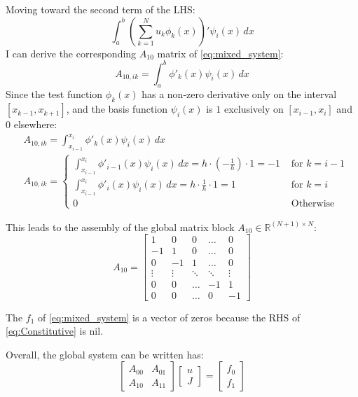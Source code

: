 \documentclass{article}
\begin{document}
Moving toward the second term of the LHS:
\begin{equation*}
    \int_a^b \left(\sum_{k=1}^{N} u_k \phi_k(x)\right)' \psi_i(x) \, dx
\end{equation*}
I can derive the corresponding $A_{10}$ matrix of \eqref{eq:mixed_system}:
\begin{equation*}
    A_{10,ik} = \int_a^b \phi'_k(x) \psi_i(x) \, dx
\end{equation*}
Since the test function $\phi_k(x)$ has a non-zero derivative only on the interval $[x_{k-1}, x_{k+1}]$, and the basis function $\psi_i(x)$ is $1$ exclusively on $[x_{i-1}, x_i]$ and $0$ elsewhere:
\begin{align*}
    &A_{10,ik} = \int_{x_{i-1}}^ {x_{i}} \phi'_k(x) \psi_i(x) \, dx  \\
    &A_{10,ik} = 
    \begin{cases}
           \int_{x_{i-1}}^ {x_{i}} \phi'_{i-1}(x) \psi_i(x) \, dx = h \cdot \left( - \frac{1}{h}\right)  \cdot 1 = - 1 &\text{  for } k = i-1 \\
           \int_{x_{i-1}}^ {x_{i}} \phi'_{i}(x) \psi_i(x) \, dx = h \cdot \frac{1}{h}  \cdot 1 =1 &\text{  for } k = i \\
           0 &\text{  Otherwise } 
    \end{cases}
\end{align*}

This leads to the assembly of the global matrix block $A_{10} \in \mathbb{R}^{(N+1) \times N}$:
\begin{equation} \label{eq:matrix_A10}
    A_{10} = 
    \begin{bmatrix}
         1 &  0 &  0 & \dots &  0 \\
        -1 &  1 &  0 & \dots &  0 \\
         0 & -1 &  1 & \dots &  0 \\
    \vdots & \vdots & \ddots & \ddots & \vdots \\
         0 &  0 & \dots & -1 &  1 \\
         0 &  0 & \dots &  0 & -1
    \end{bmatrix}
\end{equation}

The $f_1$ of \eqref{eq:mixed_system} is a vector of zeros because the RHS of \eqref{eq:Constitutive} is nil.
\newline

Overall, the global system can be written has:
\begin{equation*}
    \begin{bmatrix}
        A_{00} & A_{01} \\
        A_{10} & A_{11}
    \end{bmatrix}
    \begin{bmatrix}
        u \\
        J
    \end{bmatrix}
    =
    \begin{bmatrix}
        f_0 \\
        f_1
    \end{bmatrix}
\end{equation*}
\end{document}
